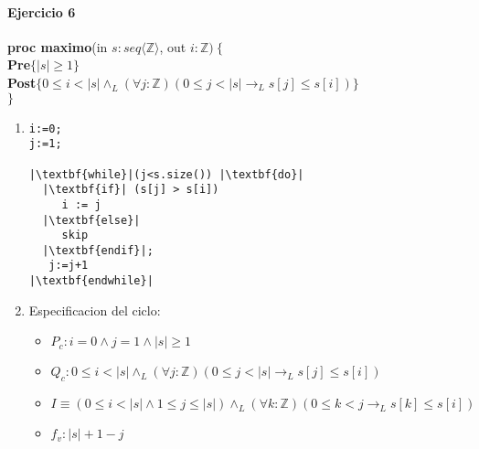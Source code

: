 \documentclass{article}
\begin{document}
\paragraph{Ejercicio 6\\}
\noindent
\textbf{proc maximo}(in $s: seq\langle\mathbb{Z}\rangle$, out $i: \mathbb{Z})\ \{$\smallskip \\
\hspace*{6mm}\textbf{Pre}$\{|s|\geq 1 \}$\\
\hspace*{6mm}\textbf{Post}$\{ 0\leq i<|s|\wedge_L (\forall j:\mathbb{Z})(0\leq j<|s|\rightarrow_L s[j]\leq s[i])\}$\\
$\}$\medskip\\

\noindent
\begin{enumerate}[label=\alph*)]
	\item 

\begin{lstlisting}
i:=0;
j:=1;

|\textbf{while}|(j<s.size()) |\textbf{do}|
  |\textbf{if}| (s[j] > s[i]) 
     i := j
  |\textbf{else}|
     skip
  |\textbf{endif}|;
   j:=j+1
|\textbf{endwhile}|
\end{lstlisting}
	\item
	
 Especificacion del ciclo:
	\begin{itemize}
		\item $P_c: i=0 \wedge j=1\wedge |s|\geq 1$
		\item $Q_c: 0\leq i<|s|\wedge_L (\forall j:\mathbb{Z})(0\leq j<|s|\rightarrow_L s[j]\leq s[i])$
		\item $I\equiv (0\leq i <|s|\wedge 1\leq j\leq |s|)\wedge_L (\forall k:\mathbb{Z})(0\leq k<j\rightarrow_L s[k]\leq s[i])$
		\item $f_v:|s|+1-j$
	\end{itemize}
	

\end{enumerate}
\end{document}
